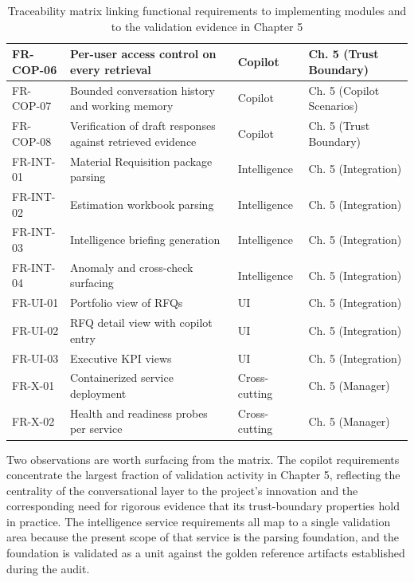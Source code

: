 \begin{table}[H]
\begin{tabular}{|p{2cm}|p{6cm}|p{2.5cm}|p{3cm}|}
FR-COP-06 & Per-user access control on every retrieval & Copilot & Ch. 5 (Trust Boundary) \\ \hline
FR-COP-07 & Bounded conversation history and working memory & Copilot & Ch. 5 (Copilot Scenarios) \\ \hline
FR-COP-08 & Verification of draft responses against retrieved evidence & Copilot & Ch. 5 (Trust Boundary) \\ \hline
FR-INT-01 & Material Requisition package parsing & Intelligence & Ch. 5 (Integration) \\ \hline
FR-INT-02 & Estimation workbook parsing & Intelligence & Ch. 5 (Integration) \\ \hline
FR-INT-03 & Intelligence briefing generation & Intelligence & Ch. 5 (Integration) \\ \hline
FR-INT-04 & Anomaly and cross-check surfacing & Intelligence & Ch. 5 (Integration) \\ \hline
FR-UI-01 & Portfolio view of RFQs & UI & Ch. 5 (Integration) \\ \hline
FR-UI-02 & RFQ detail view with copilot entry & UI & Ch. 5 (Integration) \\ \hline
FR-UI-03 & Executive KPI views & UI & Ch. 5 (Integration) \\ \hline
FR-X-01 & Containerized service deployment & Cross-cutting & Ch. 5 (Manager) \\ \hline
FR-X-02 & Health and readiness probes per service & Cross-cutting & Ch. 5 (Manager) \\ \hline
\end{tabular}
\caption{Traceability matrix linking functional requirements to implementing modules and to the validation evidence in Chapter 5}
\label{tab:traceability}
\end{table}

Two observations are worth surfacing from the matrix. The copilot requirements concentrate the largest fraction of validation activity in Chapter 5, reflecting the centrality of the conversational layer to the project's innovation and the corresponding need for rigorous evidence that its trust-boundary properties hold in practice. The intelligence service requirements all map to a single validation area because the present scope of that service is the parsing foundation, and the foundation is validated as a unit against the golden reference artifacts established during the audit.

